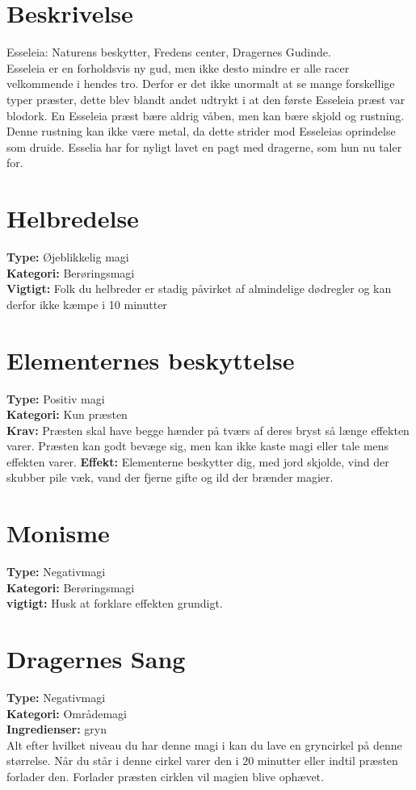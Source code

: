 \section{Beskrivelse}
Esseleia: Naturens beskytter, Fredens center, Dragernes Gudinde.\\ Esseleia er en forholdsvis ny gud, men ikke desto mindre er alle racer velkommende i hendes tro. Derfor er det ikke unormalt at se mange forskellige typer præster, dette blev blandt andet udtrykt i at den første Esseleia præst var blodork. En Esseleia præst bære aldrig våben, men kan bære skjold og rustning. Denne rustning kan ikke være metal, da dette strider mod Esseleias oprindelse som druide. Esselia har for nyligt lavet en pagt med dragerne, som hun nu taler for.

\section{Helbredelse}
\textbf{Type:} Øjeblikkelig magi \\
\textbf{Kategori:} Berøringsmagi\\
\textbf{Vigtigt:} Folk du helbreder er stadig påvirket af almindelige dødregler og kan derfor ikke kæmpe i 10 minutter

\section{Elementernes beskyttelse}
\textbf{Type:} Positiv magi\\
\textbf{Kategori:} Kun præsten\\
\textbf{Krav:} Præsten skal have begge hænder på tværs af deres bryst så længe effekten varer. Præsten kan godt bevæge sig, men kan ikke kaste magi eller tale mens effekten varer.
\textbf{Effekt:} Elementerne beskytter dig, med jord skjolde, vind der skubber pile væk, vand der fjerne gifte og ild der brænder magier.

\section{Monisme}
\textbf{Type:} Negativmagi\\
\textbf{Kategori:} Berøringsmagi\\
\textbf{vigtigt:} Husk at forklare effekten grundigt.


\section{Dragernes Sang}
\textbf{Type:} Negativmagi\\
\textbf{Kategori:} Områdemagi\\
\textbf{Ingredienser:} gryn\\
Alt efter hvilket niveau du har denne magi i kan du lave en gryncirkel på denne størrelse. Når du står i denne cirkel varer den i 20 minutter eller indtil præsten forlader den. Forlader præsten cirklen vil magien blive ophævet.
